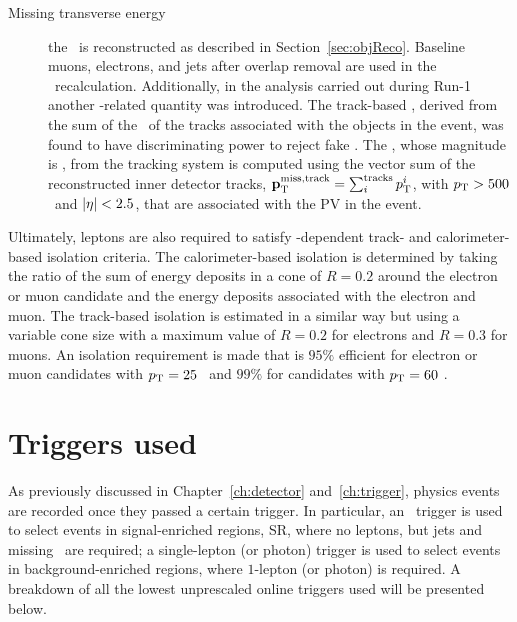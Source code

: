 \begin{description}
			\item[Missing transverse energy]
				the \met\ is reconstructed as described in Section~\ref{sec:objReco}. Baseline muons, electrons, and jets after overlap removal are used in the \met\ recalculation. 
				Additionally, in the analysis carried out during Run-1~\cite{stop0LRun1} another \met-related quantity was introduced. The track-based \met, derived from the sum of the \pt\ of the tracks associated with the objects in the event, was found to have discriminating power to reject fake \met. The \ptmisstrk, whose magnitude is \mettrk, from the tracking system is computed using the vector sum of the reconstructed inner detector tracks, $\mathbf{p}_{\mathrm{T}}^{\mathrm{miss, track}} = \sum_i^{\mathrm{tracks}} p_{\mathrm{T}}^i$, with $p_{\mathrm{T}} > 500$ \MeV\ and $|\eta| < 2.5$, that are associated with the \ac{PV} in the event. 
 		\end{description}

		Ultimately, leptons are also required to satisfy \pt-dependent track- and calorimeter-based isolation criteria. The calorimeter-based isolation is determined by taking the ratio of the sum of energy deposits in a cone of $R = 0.2$ around the electron or muon candidate and the energy deposits associated with the electron and muon. The track-based isolation is estimated in a similar way but using a variable cone size with a maximum value of $R = 0.2$ for electrons and $R = 0.3$ for muons. An isolation requirement is made that is $95\%$ efficient for electron or muon candidates with $p_{\mathrm{T}} = 25$ \GeV\ and $99\%$ for candidates with $p_{\mathrm{T}} = 60$ \GeV.

		
	\section{Triggers used}
	\label{sec:trig_used}

		As previously discussed in Chapter~\ref{ch:detector} and~\ref{ch:trigger}, physics events are recorded once they passed a certain trigger. In particular, an \met\ trigger is used to select events in signal-enriched regions, \ac{SR}, where no leptons, but jets and missing \et\ are required; a single-lepton (or photon) trigger is used to select events in background-enriched regions, where $1$-lepton (or photon) is required. A breakdown of all the lowest unprescaled online triggers used will be presented below.

